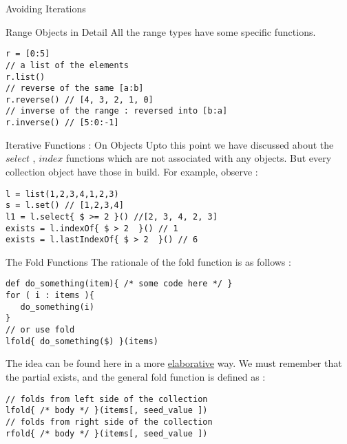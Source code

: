 \begin{section}{Avoiding Iterations}
\begin{subsection}{Range Objects in Detail}
All the range types have some specific functions.

\begin{lstlisting}[style=JexlStyle]
r = [0:5]
// a list of the elements  
r.list()
// reverse of the same [a:b] 
r.reverse() // [4, 3, 2, 1, 0]
// inverse of the range : reversed into [b:a] 
r.inverse() // [5:0:-1]  
\end{lstlisting}
\end{subsection}

\begin{subsection}{Iterative Functions : On Objects}
Upto this point we have discussed about the $select$ , $index$ functions
which are not associated with any objects. But every collection object 
have those in build. For example, observe :
\begin{center}\begin{minipage}{\linewidth}
\begin{lstlisting}[style=JexlStyle]
l = list(1,2,3,4,1,2,3)
s = l.set() // [1,2,3,4]
l1 = l.select{ $ >= 2 }() //[2, 3, 4, 2, 3] 
exists = l.indexOf{ $ > 2  }() // 1
exists = l.lastIndexOf{ $ > 2  }() // 6
\end{lstlisting}
\end{minipage}\end{center}

\end{subsection}

\begin{subsection}{The Fold Functions}
The rationale of the fold function is as follows :

\begin{lstlisting}[style=JexlStyle]
def do_something(item){ /* some code here */ }
for ( i : items ){
   do_something(i)
}
// or use fold
lfold{ do_something($) }(items)
\end{lstlisting}
The idea can be found here in a more \href{https://en.wikipedia.org/wiki/Fold\_(higher-order\_function)}{elaborative} way.
We must remember that the partial exists, and the general fold function is defined as :

\begin{center}\begin{minipage}{\linewidth}
\begin{lstlisting}[style=JexlStyle]
// folds from left side of the collection 
lfold{ /* body */ }(items[, seed_value ])
// folds from right side of the collection 
rfold{ /* body */ }(items[, seed_value ])
\end{lstlisting}
\end{minipage}\end{center}



\end{subsection}
\end{section}
